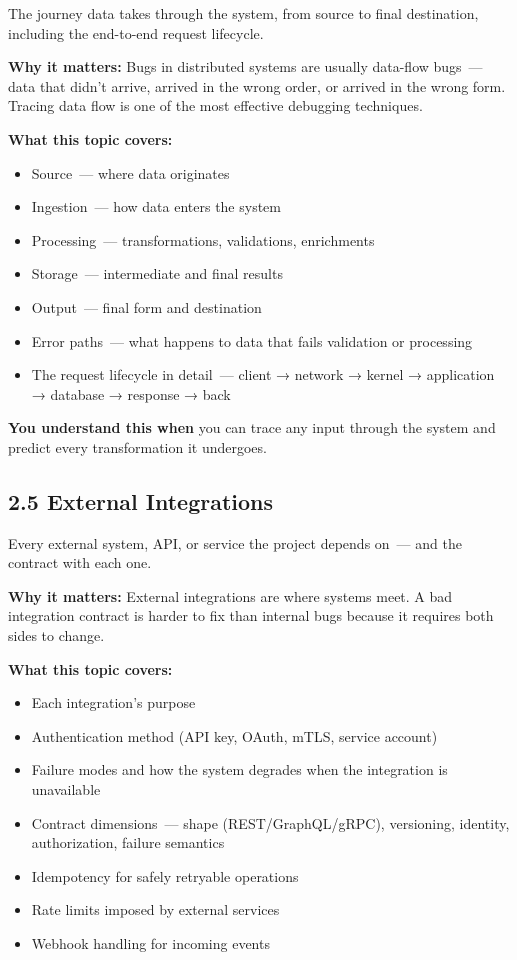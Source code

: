 The journey data takes through the system, from source to final destination, including the end-to-end request lifecycle.

\textbf{Why it matters:} Bugs in distributed systems are usually data-flow bugs~--- data that didn't arrive, arrived in the wrong order, or arrived in the wrong form. Tracing data flow is one of the most effective debugging techniques.

\textbf{What this topic covers:}

\begin{itemize}
\tightlist
\item
  Source~--- where data originates
\item
  Ingestion~--- how data enters the system
\item
  Processing~--- transformations, validations, enrichments
\item
  Storage~--- intermediate and final results
\item
  Output~--- final form and destination
\item
  Error paths~--- what happens to data that fails validation or processing
\item
  The request lifecycle in detail~--- client → network → kernel → application → database → response → back
\end{itemize}

\noindent{}\textbf{You understand this when} you can trace any input through the system and predict every transformation it undergoes.

\subsection*{2.5 External Integrations}\label{project-planning-guide:25-external-integrations}

Every external system, API, or service the project depends on~--- and the contract with each one.

\textbf{Why it matters:} External integrations are where systems meet. A bad integration contract is harder to fix than internal bugs because it requires both sides to change.

\textbf{What this topic covers:}

\begin{itemize}
\tightlist
\item
  Each integration's purpose
\item
  Authentication method (API key, OAuth, mTLS, service account)
\item
  Failure modes and how the system degrades when the integration is unavailable
\item
  Contract dimensions~--- shape (REST/GraphQL/gRPC), versioning, identity, authorization, failure semantics
\item
  Idempotency for safely retryable operations
\item
  Rate limits imposed by external services
\item
  Webhook handling for incoming events
\end{itemize}

